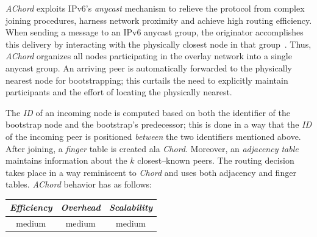 \emph{AChord} \cite{DK2006} exploits IPv6's \emph{anycast} mechanism to
relieve the protocol from complex joining procedures,
harness network proximity and achieve high routing efficiency. 
When sending a message to an IPv6 anycast group, 
the originator accomplishes this delivery by interacting with
the physically closest node in that group~\cite{M2002}.
Thus, \emph{AChord} organizes all nodes participating
in the overlay network into a single anycast group. 
An arriving peer is automatically forwarded to the physically 
nearest node for
bootstrapping; this curtails the need to explicitly maintain participants
and the effort of locating the physically nearest. 

The \emph{ID} of an incoming node is computed based on 
both the identifier of the bootstrap node 
and the bootstrap's predecessor;
this is  done in a way that the \emph{ID} of the 
incoming peer is positioned \emph{between} the two identifiers mentioned above. 
After joining, a \emph{finger} table is created ala \emph{Chord}. 
Moreover, an \emph{adjacency table} maintains 
information about the $k$ closest--known peers. 
The routing decision takes place in a way reminiscent to \emph{Chord}
and uses both adjacency and finger tables.
\emph{AChord} behavior has as follows:
\begin{center}
{\footnotesize
\begin{tabular}{ccc}
\emph{Efficiency} & \emph{Overhead} & \emph{Scalability} \\
\hline
medium &
medium &
medium
\end{tabular}
}
\end{center}


